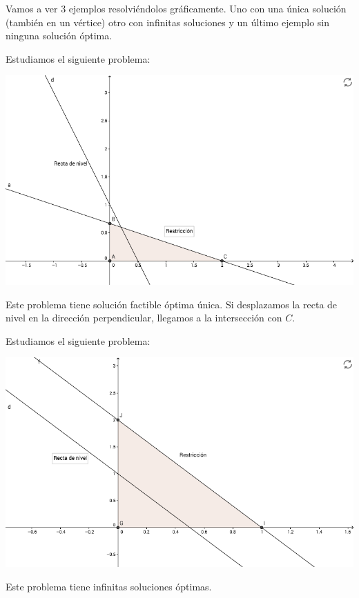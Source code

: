 Vamos a ver 3 ejemplos resolviéndolos gráficamente. Uno con una única solución (también en un vértice) otro con infinitas soluciones y un último ejemplo sin ninguna solución óptima.

\begin{example}
Estudiamos el siguiente problema:

\begin{ioprob}
\end{ioprob}

\begin{center}
\includegraphics[scale=0.45]{img/io-intro_1.png}
\end{center}

Este problema tiene solución factible óptima única. Si desplazamos la recta de nivel en la dirección perpendicular, llegamos a la intersección con $C$.
\end{example}

\begin{example}
Estudiamos el siguiente problema:

\begin{ioprob} 
\end{ioprob}


\begin{center}
\includegraphics[scale=0.45]{img/io-intro_2.png}
\end{center}


Este problema tiene infinitas soluciones óptimas.
\end{example}

